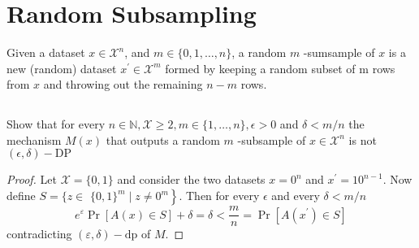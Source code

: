 \documentclass{ctexart}
\begin{document}
\section{Random Subsampling}
Given a dataset $x \in \mathcal{X}^{n}$, and $m \in\{0,1, \ldots, n\}$, a random $m$ -sumsample of $x$ is a new (random) dataset $x^{\prime} \in \mathcal{X}^{m}$ formed by keeping a random subset of $\mathrm{m}$ rows from $x$ and throwing out the remaining $n-m$ rows.
\subsection{}
Show that for every $n \in \mathbb{N}, \mathcal{X} \geq 2, m \in\{1, \ldots, n\}, \epsilon>0$ and $\delta<m / n$
the mechanism $M(x)$ that outputs a random $m$ -subsample of $x \in \mathcal{X}^{n}$ is not $(\epsilon, \delta)-\mathrm{DP}$
\begin{proof}
    Let $\mathcal{X}=\{0,1\}$ and consider the two datasets $x=0^{n}$ and $x^{\prime}=10^{n-1} .$ Now define $S=\{z \in$ $\left.\{0,1\}^{m} \mid z \neq 0^{m}\right\}$. Then for every $\epsilon$ and every $\delta<m / n$
    $$
        e^{\varepsilon} \operatorname{Pr}[A(x) \in S]+\delta=\delta<\frac{m}{n}=\operatorname{Pr}\left[A\left(x^{\prime}\right) \in S\right]
    $$
    contradicting $(\varepsilon, \delta)-\mathrm{d} \mathrm{p}$ of $M$.
\end{proof}
\end{document}
